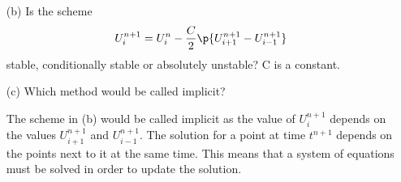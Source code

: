 \documentclass[11pt, oneside]{article}
\begin{document}
\begin{enumerate}
\begin{enumerate}
      \item[(b)]
        Is the scheme
        \[
          U_i^{n+1} = U_i^n - \frac{C}{2} \p{U_{i+1}^{n+1} - U_{i-1}^{n+1}}
        \]
        stable, conditionally stable or absolutely unstable?
        C is a constant.

      \item[(c)] %
        Which method would be called implicit?

        The scheme in (b) would be called implicit as the value of $U^{n+1}_i$
        depends on the values $U^{n+1}_{i+1}$ and $U^{n+1}_{i-1}$.
        The solution for a point at time $t^{n+1}$ depends on the points next
        to it at the same time.
        This means that a system of equations must be solved in order to update
        the solution.
    \end{enumerate}
\end{enumerate}
\end{document}

